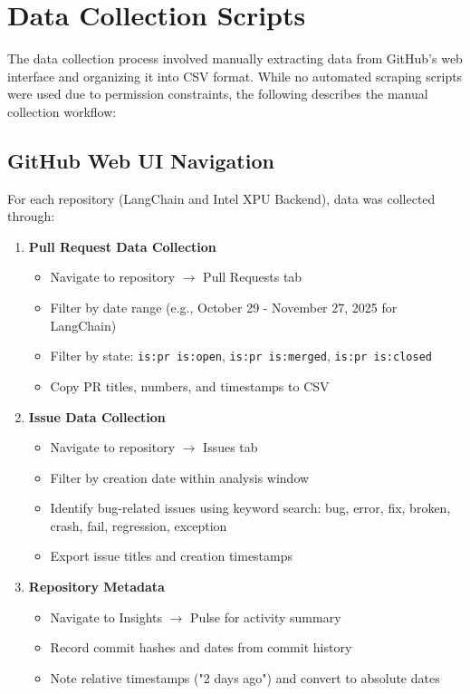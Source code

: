 \section{Data Collection Scripts}

The data collection process involved manually extracting data from
GitHub's web interface and organizing it into CSV format. While no
automated scraping scripts were used due to permission constraints,
the following describes the manual collection workflow:

\subsection{GitHub Web UI Navigation}

For each repository (LangChain and Intel XPU Backend), data was
collected through:

\begin{enumerate}
  \item \textbf{Pull Request Data Collection}
    \begin{itemize}
      \item Navigate to repository $\rightarrow$ Pull Requests tab
      \item Filter by date range (e.g., October 29 - November 27,
        2025 for LangChain)
      \item Filter by state: \texttt{is:pr is:open}, \texttt{is:pr
        is:merged}, \texttt{is:pr is:closed}
      \item Copy PR titles, numbers, and timestamps to CSV
    \end{itemize}

  \item \textbf{Issue Data Collection}
    \begin{itemize}
      \item Navigate to repository $\rightarrow$ Issues tab
      \item Filter by creation date within analysis window
      \item Identify bug-related issues using keyword search: bug,
        error, fix, broken, crash, fail, regression, exception
      \item Export issue titles and creation timestamps
    \end{itemize}

  \item \textbf{Repository Metadata}
    \begin{itemize}
      \item Navigate to Insights $\rightarrow$ Pulse for activity summary
      \item Record commit hashes and dates from commit history
      \item Note relative timestamps ("2 days ago") and convert to
        absolute dates
    \end{itemize}
\end{enumerate}

